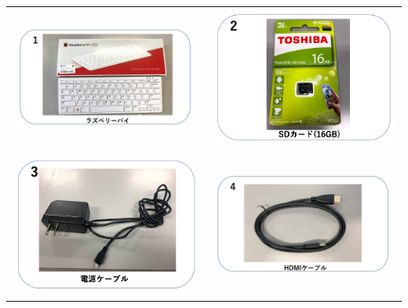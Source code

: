 \documentclass[a4paper,12pt]{jarticle}
\begin{document}
\begin{tabular}{cc}
  \includegraphics[width=6.488cm,height=4.697cm]{textbook-img009-2023.png}
   &
  \includegraphics[width=6.488cm,height=4.697cm]{textbook-img010.png} \\

  \includegraphics[width=6.488cm,height=4.697cm]{textbook-img007.png}
   &
  \includegraphics[width=6.488cm,height=4.697cm]{textbook-img008-2023.png} \\


\end{tabular}
\end{document}
